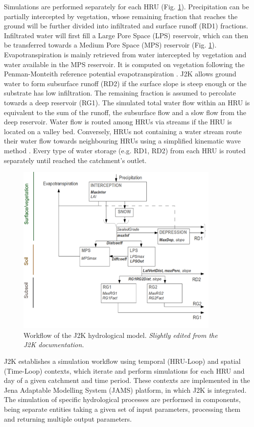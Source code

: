 Simulations are performed separately for each HRU (Fig. \ref{hydro:fig1}). Precipitation can be partially intercepted by vegetation, whose remaining fraction that reaches the ground will be further divided into infiltrated and surface runoff (RD1) fractions. Infiltrated water will first fill a Large Pore Space (LPS) reservoir, which can then be transferred towards a Medium Pore Space (MPS) reservoir (Fig. \ref{hydro:fig1}). Evapotranspiration is mainly retrieved from water intercepted by vegetation and water available in the MPS reservoir. It is computed on vegetation following the Penman-Monteith reference potential evapotranspiration \citep{howell_penman-monteith_2004}. J2K allows ground water to form subsurface runoff (RD2) if the surface slope is steep enough or the substrate has low infiltration. The remaining fraction is assumed to percolate towards a deep reservoir (RG1). The simulated total water flow within an HRU is equivalent to the sum of the runoff, the subsurface flow and a slow flow from the deep reservoir. Water flow is routed among HRUs via streams if the HRU is located on a valley bed. Conversely, HRUs not containing a water stream route their water flow towards neighbouring HRUs using a simplified kinematic wave method \citep{chen_surface_1970}. Every type of water storage (e.g. RD1, RD2) from each HRU is routed separately until reached the catchment's outlet. 

\begin{figure}[h]
\centering
\includegraphics[width=10cm]{Figures/hydro/Figure_1.png}
\caption{Workflow of the J2K hydrological model. \textit{Slightly edited from the J2K documentation.}} 
\label{hydro:fig1}
\end{figure}

J2K establishes a simulation workflow using temporal (HRU-Loop) and spatial (Time-Loop) contexts, which iterate and perform simulations for each HRU and day of a given catchment and time period. These contexts are implemented in the Jena Adaptable Modelling System (JAMS) platform, in which J2K is integrated. The simulation of specific hydrological processes are performed in components, being separate entities taking a given set of input parameters, processing them and returning multiple output parameters. 

